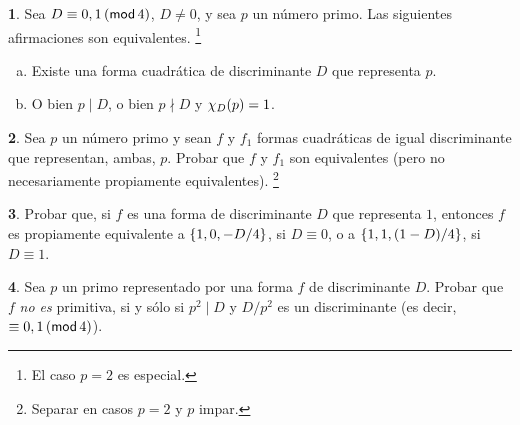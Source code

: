 \theoremstyle{definition}
\newtheorem{ejerRepresentaciones}{\ejername}[section]


\begin{ejerRepresentaciones}\label{ejer:representaciones:kronecker}
	Sea $D\equiv 0,1\tmodulo[4]$, $D\neq 0$, y sea $p$
	un n\'umero primo. Las siguientes afirmaciones
	son equivalentes.%
	\footnote{
		El caso $p=2$ es especial.
	}
	\begin{enumerate}[(a)]
		\item\label{item:ejer:representaciones:kronecker:representable}
			Existe una forma cuadr\'atica de discriminante
			$D$ que representa $p$.
		\item\label{item:ejer:representaciones:kronecker:nucleo}
			O bien $p\mid D$, o bien $p\nmid D$ y
			$\varkronecker[D](p)=1$.
	\end{enumerate}
\end{ejerRepresentaciones}

\begin{ejerRepresentaciones}\label{ejer:representaciones:equivalentes:primo}
	Sea $p$ un n\'umero primo y sean $f$ y $f_1$ formas
	cuadr\'aticas de igual discriminante que representan,
	ambas, $p$. Probar que $f$ y $f_1$ son equivalentes
	(pero no necesariamente propiamente equivalentes).%
	\footnote{
		Separar en casos $p=2$ y $p$ impar.
	}
\end{ejerRepresentaciones}

\begin{ejerRepresentaciones}\label{ejer:representaciones:equivalentes:uno}
	Probar que, si $f$ es una forma de discriminante $D$ que
	representa $1$, entonces $f$ es propiamente equivalente a
	$\binaria{1,0,-D/4}$, si $D\equiv 0$, o a
	$\binaria{1,1,(1-D)/4}$, si $D\equiv 1$.%
\end{ejerRepresentaciones}

\begin{ejerRepresentaciones}
	Sea $p$ un primo representado por una forma $f$ de discriminante
	$D$. Probar que $f$ \emph{no es} primitiva, si y s\'olo si
	$p^2\mid D$ y $D/p^2$ es un discriminante
	(es decir, $\equiv 0,1\tmodulo[4]$).
\end{ejerRepresentaciones}


